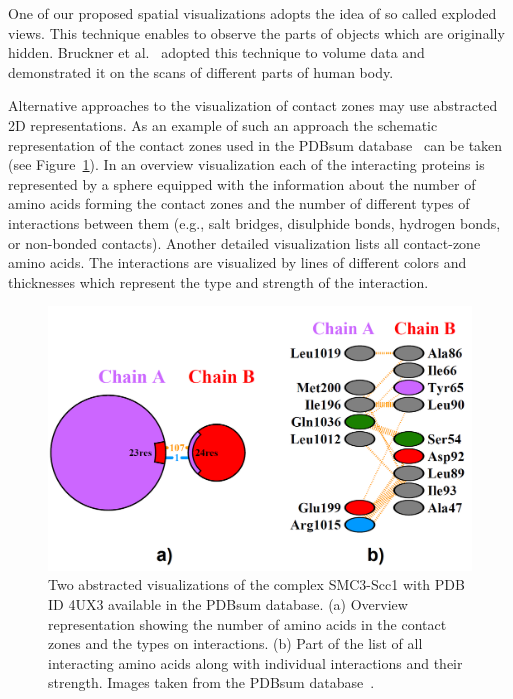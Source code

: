 \documentclass[journal]{vgtc}                %
\begin{document}
One of our proposed spatial visualizations adopts the idea of so called exploded views.
This technique enables to observe the parts of objects which are originally hidden.
Bruckner et al.~\cite{Bruckner2006} adopted this technique to volume data and demonstrated it on the scans of different parts of human body.

Alternative approaches to the visualization of contact zones may use abstracted 2D representations.
As an example of such an approach the schematic representation of the contact zones used in the PDBsum database~\cite{pdbsum} can be taken (see Figure~\ref{fig:pdbsum}). 
In an overview visualization each of the interacting proteins is represented by a sphere equipped with the information about the number of amino acids forming the contact zones and the number of different types of interactions between them (e.g., salt bridges, disulphide bonds, hydrogen bonds, or non-bonded contacts).
Another detailed visualization lists all contact-zone amino acids. 
The interactions are visualized by lines of different colors and thicknesses which represent the type and strength of the interaction.

\begin{figure}[bt]
  \centering
  \includegraphics[width=1.0\columnwidth]{pdbsum.png}
  \caption{Two abstracted visualizations of the complex SMC3-Scc1 with PDB ID 4UX3 available in the PDBsum database. (a) Overview representation showing the number of amino acids in the contact zones and the types on interactions. (b) Part of the list of all interacting amino acids along with individual interactions and their strength. Images taken from the PDBsum database~\cite{pdbsum}.}
  \label{fig:pdbsum}
\end{figure}
\end{document}
